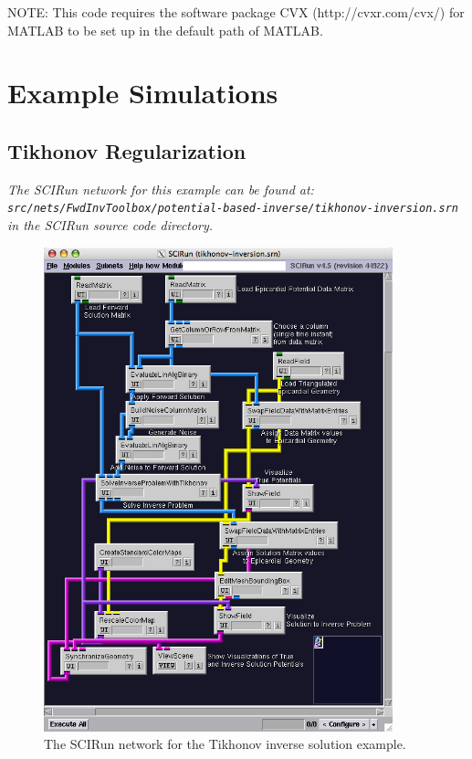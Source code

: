 \documentclass[fleqn,11pt,openany]{book}
\begin{document}
NOTE: This code requires the software package CVX (http://cvxr.com/cvx/) for MATLAB to be set up in the default path of MATLAB.

\section{Example Simulations}

\subsection{Tikhonov Regularization}

\vspace{5pt}\textit{The SCIRun network for this example can be found at:\\{\tt src/nets/FwdInvToolbox/potential-based-inverse/tikhonov-inversion.srn}\\in the SCIRun source code directory.}\vspace{5pt}

\begin{figure}[H]
\begin{center}
\includegraphics[width=0.9\textwidth]{ECGToolkitGuide_figures/TikhonovNetwork.png}
\caption{The SCIRun network for the Tikhonov inverse solution example.}
\label{TikhonovNetworkExample}
\end{center}
\end{figure}
\end{document}
